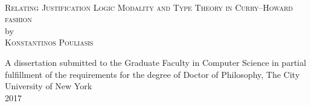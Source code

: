 \begin{titlepage}

\begin{center}

~\vspace{2in}

\textsc{Relating Justification Logic Modality and Type Theory in Curry--Howard fashion} \\[0.5in]
by \\[0.5in]
\textsc{Konstantinos Pouliasis} 

\vspace{\fill}
A dissertation submitted to the Graduate Faculty in Computer Science in partial fulfillment of the requirements for the degree of Doctor of Philosophy, The City University of New York \\[0.25in]
2017

\end{center}

\end{titlepage}
